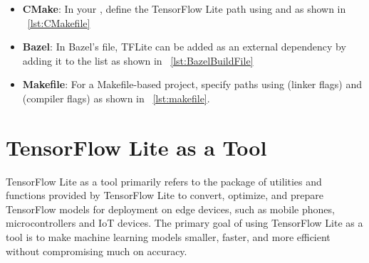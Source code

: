 \begin{itemize}
	\item \textbf{CMake}: In your , define the TensorFlow Lite path using  and  as shown in ~\ref{lst:CMakefile}

\begin{code}
	
\end{code}

	\item \textbf{Bazel}: In Bazel's  file, TFLite can be added as an external dependency by adding it to the  list as shown in ~\ref{lst:BazelBuildFile}
	
\begin{code}
	
\end{code}
	
	\item \textbf{Makefile}: For a Makefile-based project, specify paths using  (linker flags) and  (compiler flags) as shown in ~\ref{lst:makefile}.

\begin{code}
	
\end{code}

\end{itemize}

\section{TensorFlow Lite as a Tool}
TensorFlow Lite as a tool primarily refers to the package of utilities and functions provided by TensorFlow Lite to convert, optimize, and prepare TensorFlow models for deployment on edge devices, such as mobile phones, microcontrollers and IoT devices. The primary goal of using TensorFlow Lite as a tool is to make machine learning models smaller, faster, and more efficient without compromising much on accuracy. \cite{tensorflow_lite:2024}

